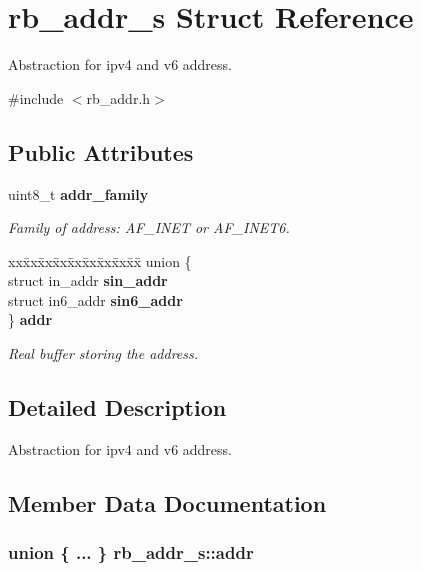 \section{rb\_addr\_s Struct Reference}
\label{structrb__addr__s}


Abstraction for ipv4 and v6 address.  




{\ttfamily \#include $<$rb\_addr.\+h$>$}

\subsection*{Public Attributes}
\begin{DoxyCompactItemize}
\item 
uint8\_t {\bf addr\_family}
\begin{DoxyCompactList}\small\item\em Family of address\+: A\+F\_\+I\+N\+E\+T or A\+F\_\+I\+N\+E\+T6. \end{DoxyCompactList}\item 
\begin{tabbing}
xx\=xx\=xx\=xx\=xx\=xx\=xx\=xx\=xx\=\kill
union \{\\
\>struct in\_addr {\bf sin\_addr}\\
\>struct in6\_addr {\bf sin6\_addr}\\
\} {\bf addr}\\

\end{tabbing}\begin{DoxyCompactList}\small\item\em Real buffer storing the address. \end{DoxyCompactList}\end{DoxyCompactItemize}


\subsection{Detailed Description}
Abstraction for ipv4 and v6 address. 

\subsection{Member Data Documentation}
\subsubsection[{addr}]{\setlength{\rightskip}{0pt plus 5cm}union \{ ... \}  rb\_addr\_s\+::addr}\label{structrb__addr__s_ab669e4f43ac662476dd7e1824f28f422}


